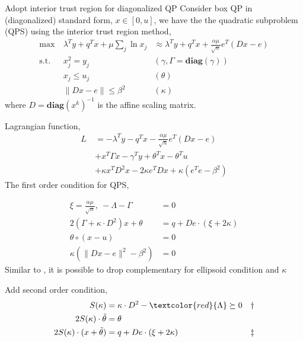 \documentclass{beamerswitch}
\newcommand{\diag}{\textbf{diag}}
\newcommand{\st}{\mathrm{s.t.\;}}
\newcommand{\red}[1]{\textcolor{red}{#1}}
\begin{document}
\begin{frame}[allowframebreaks]{Adopt interior trust region for diagonalized QP}
  Consider box QP in (diagonalized) standard form, \(x \in [0, u]\), we have the the quadratic subproblem (QPS) using the interior trust region method,
  \begin{equation}\label{eq.interior.boxqp}
    \begin{aligned}
      \max ~ & \lambda^T y + q^Tx  + \mu \sum_j \ln x_j & \approx \lambda^T y + q^Tx + \frac{\alpha \mu}{\sqrt n} e^T(Dx-e) \\
      \st ~  & x_j^2 = y_j                              & (\gamma, \Gamma = \diag(\gamma))                                  \\
             & x_j \le u_j                              & (\theta)                                                          \\
             & \|Dx - e\| \le \beta^2                   & (\kappa)
    \end{aligned}
  \end{equation}
  where \(D = \diag(x^k)^{-1}\) is the affine scaling matrix.
  \framebreak

  Lagrangian function,
  \begin{align*}
    L ~ & = -\lambda^Ty - q^Tx - \frac{\alpha \mu}{\sqrt n} e^T(Dx-e) \\
        & + x^T\Gamma x - \gamma^Ty + \theta^Tx - \theta^Tu           \\
        & + \kappa x^TD^2x - 2\kappa e^TDx + \kappa(e^Te - \beta^2)
  \end{align*}
  The first order condition for QPS,

  \begin{align*}
    \xi                                    =  \frac{\alpha \mu}{\sqrt n},~ -\Lambda - \Gamma & = 0                          \\
    2(\Gamma + \kappa \cdot D^2)x + \theta                                                   & = q + De\cdot(\xi + 2\kappa) \\
    \theta \circ (x - u)                                                                     & = 0                          \\
    \kappa \left (\|Dx - e\|^2 - \beta^2   \right )                                          & = 0
  \end{align*}
  Similar to \cite{ye_extension_1989}, it is possible to drop complementary for ellipsoid condition and \(\kappa\)

  \framebreak
  Add second order condition,
  \begin{align*}
    S(\kappa)                             & = \kappa \cdot D^2 - \red{\Lambda} \succeq 0 & \dagger  \\
    2S (\kappa) \cdot \tilde \theta       & = \theta                                     &          \\
    2S (\kappa) \cdot (x + \tilde \theta) & = q + De\cdot(\xi + 2\kappa)                 & \ddagger \\
  \end{align*}


\end{frame}
\end{document}
